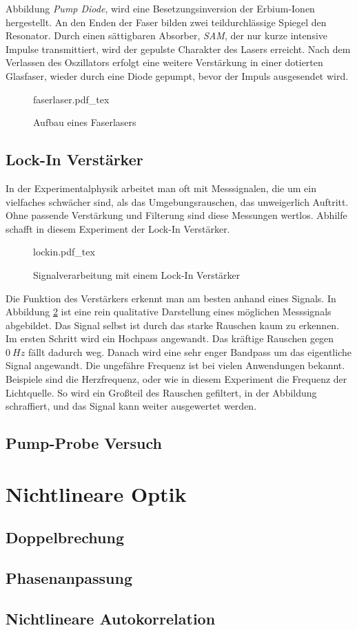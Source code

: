 Abbildung \emph{Pump Diode}, wird eine Besetzungsinversion der Erbium-Ionen
hergestellt. An den Enden der Faser bilden zwei teildurchlässige Spiegel den 
Resonator. Durch einen sättigbaren Absorber, \emph{SAM}, der nur kurze intensive
Impulse transmittiert, wird der gepulste Charakter des Lasers erreicht. Nach dem 
Verlassen des Oszillators erfolgt eine weitere Verstärkung in einer dotierten 
Glasfaser, wieder durch eine Diode gepumpt, bevor der Impuls ausgesendet wird. 
\autocite{phying, zinth}
\begin{figure}[H]
  \centering
  {faserlaser.pdf_tex}
  \caption{Aufbau eines Faserlasers}
  \label{abb:faser}
\end{figure}


    \subsection{Lock-In Verstärker}

In der Experimentalphysik arbeitet man oft mit Messsignalen, die um ein 
vielfaches schwächer sind, als das Umgebungsrauschen, das unweigerlich
Auftritt. Ohne passende Verstärkung und Filterung sind diese Messungen wertlos.
Abhilfe schafft in diesem Experiment der Lock-In Verstärker. 
\begin{figure}[hb]
  \centering
  {lockin.pdf_tex}
  \caption{Signalverarbeitung mit einem Lock-In Verstärker}
  \label{abb:lockin}
\end{figure}
Die Funktion des Verstärkers erkennt man am besten anhand eines Signals. In 
Abbildung \ref{abb:lockin} ist eine rein qualitative Darstellung eines möglichen
Messsignals abgebildet. Das Signal selbst ist durch das starke Rauschen kaum zu
erkennen. Im ersten Schritt wird ein Hochpass angewandt. Das kräftige Rauschen
gegen $\SI{0}{Hz}$ fällt dadurch weg. Danach wird eine sehr enger Bandpass um
das eigentliche Signal angewandt. Die ungefähre Frequenz ist bei vielen Anwendungen
bekannt. Beispiele sind die Herzfrequenz, oder wie in diesem Experiment die 
Frequenz der Lichtquelle. So wird ein Großteil des Rauschen gefiltert, in der 
Abbildung schraffiert, und das Signal kann weiter ausgewertet werden.

    \subsection{Pump-Probe Versuch}

\section{Nichtlineare Optik}
    \subsection{Doppelbrechung}

    \subsection{Phasenanpassung}

    \subsection{Nichtlineare Autokorrelation}

